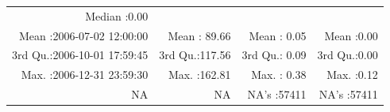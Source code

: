 \documentclass[
  10pt,
  a4paper,oneside]{article}
\begin{document}
\begin{longtable}[]{@{}rrrr@{}}
\begin{minipage}[t]{0.18\columnwidth}
Median :0.00\strut
\end{minipage}\tabularnewline
\begin{minipage}[t]{0.34\columnwidth}\raggedleft
Mean :2006-07-02 12:00:00\strut
\end{minipage} & \begin{minipage}[t]{0.19\columnwidth}\raggedleft
Mean : 89.66\strut
\end{minipage} & \begin{minipage}[t]{0.18\columnwidth}\raggedleft
Mean : 0.05\strut
\end{minipage} & \begin{minipage}[t]{0.18\columnwidth}\raggedleft
Mean :0.00\strut
\end{minipage}\tabularnewline
\begin{minipage}[t]{0.34\columnwidth}\raggedleft
3rd Qu.:2006-10-01 17:59:45\strut
\end{minipage} & \begin{minipage}[t]{0.19\columnwidth}\raggedleft
3rd Qu.:117.56\strut
\end{minipage} & \begin{minipage}[t]{0.18\columnwidth}\raggedleft
3rd Qu.: 0.09\strut
\end{minipage} & \begin{minipage}[t]{0.18\columnwidth}\raggedleft
3rd Qu.:0.00\strut
\end{minipage}\tabularnewline
\begin{minipage}[t]{0.34\columnwidth}\raggedleft
Max. :2006-12-31 23:59:30\strut
\end{minipage} & \begin{minipage}[t]{0.19\columnwidth}\raggedleft
Max. :162.81\strut
\end{minipage} & \begin{minipage}[t]{0.18\columnwidth}\raggedleft
Max. : 0.38\strut
\end{minipage} & \begin{minipage}[t]{0.18\columnwidth}\raggedleft
Max. :0.12\strut
\end{minipage}\tabularnewline
\begin{minipage}[t]{0.34\columnwidth}\raggedleft
NA\strut
\end{minipage} & \begin{minipage}[t]{0.19\columnwidth}\raggedleft
NA\strut
\end{minipage} & \begin{minipage}[t]{0.18\columnwidth}\raggedleft
NA's :57411\strut
\end{minipage} & \begin{minipage}[t]{0.18\columnwidth}\raggedleft
NA's :57411\strut
\end{minipage}\tabularnewline
\bottomrule
\end{longtable}
\end{document}
